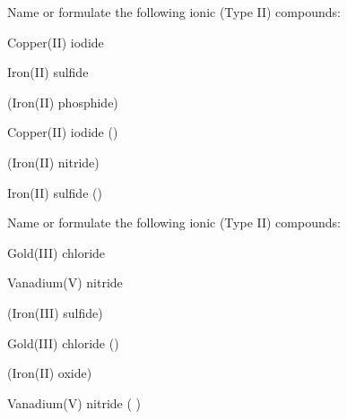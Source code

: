 \documentclass[main.tex]{subfiles}
\begin{document}
\begin{multicols*}{2}
\begin{question}[ID=\the\value{numA}]
Name or formulate the following ionic (Type II) compounds:
\begin{inparaenum}[(a)]
\item {}		%
\item Copper(II) iodide 	%
\item {}		%
\item Iron(II) sulfide		%
\end{inparaenum}
\end{question}
\begin{solution}
\begin{inparaenum}[(a)]
\item {}		(Iron(II) phosphide)	
\item Copper(II) iodide 	()
\item {}		(Iron(II) nitride)
\item Iron(II) sulfide		()
 \end{inparaenum}\hspace{0.1cm}\end{solution}
\begin{question}[ID=\the\value{numA}]
Name or formulate the following ionic (Type II) compounds:
\begin{inparaenum}[(a)]
\item {}		%
\item Gold(III) chloride	%
\item {}			%
\item Vanadium(V) nitride	%
\end{inparaenum}
\end{question}
\begin{solution}
\begin{inparaenum}[(a)]
\item {}		(Iron(III) sulfide)
\item Gold(III) chloride	()
\item {}			(Iron(II) oxide)
\item Vanadium(V) nitride	( )
 \end{inparaenum}\hspace{0.1cm}\end{solution}






\end{multicols*}
\end{document}
